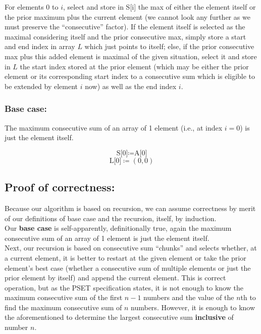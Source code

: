 \documentclass[conference]{styles/acmsiggraph}
\newcommand{\?}{\stackrel{?}{=}}
\begin{document}
For elements $0$ to $i$, select and store in S[i] the max of either the element itself or the prior maximum plus the current element (we cannot look any further as we must preserve the \enquote{consecutive} factor).  If the element itself is selected as the maximal considering itself and the prior consecutive max, simply store a start and end index in array $L$ which just points to itself; else, if the prior consecutive max plus this added element is maximal of the given situation, select it and store in $L$ the start index stored at the prior element (which may be either the prior element or its corresponding start index to a consecutive sum which is eligible to be extended by element $i$ now) as well as the end index $i$.


\subsubsection{Base case:}
The maximum consecutive sum of an array of 1 element (i.e., at index $i=0$) is just the element itself.

$$\text{S[0]} \coloneq \text{A[0]}$$
$$\text{L[0]} \coloneq (0,0)$$


\subsection{Proof of correctness:}
Because our algorithm is based on recursion, we can assume correctness by merit of our definitions of base case and the recursion, itself, by induction. \\

Our \textbf{base case} is self-apparently, definitionally true, again the maximum consecutive sum of an array of 1 element is just the element itself. \\

Next, our recursion is based on consecutive sum \enquote{chunks} and selects whether, at a current element, it is better to restart at the given element or take the prior element's best case (whether a consecutive sum of multiple elements or just the prior element by itself) and append the current element.  This is correct operation, but as the PSET specification states, it is not enough to know the maximum consecutive sum of the first $n-1$ numbers and the value of the $n$th to find the maximum consecutive sum of $n$ numbers.  However, it is enough to know the aforementioned to determine the largest consecutive sum \textbf{inclusive} of number $n$. \\
\end{document}
